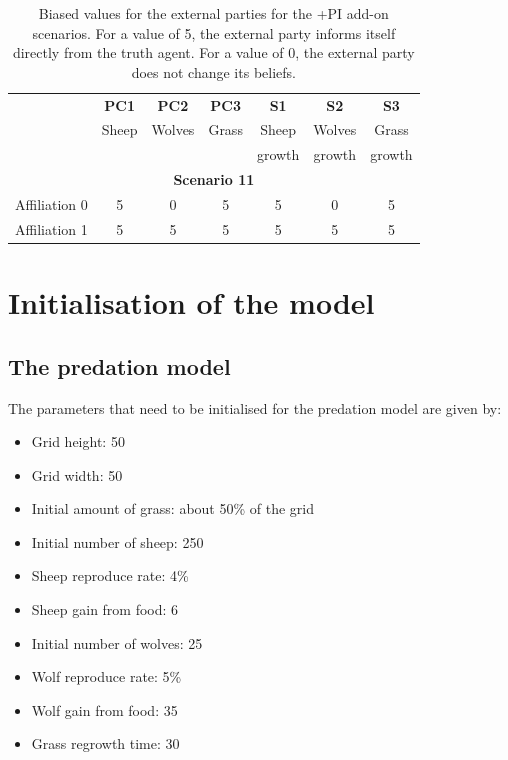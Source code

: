 \documentclass[12pt]{article}
\begin{document}
\begin{table}[h!]
\begin{center}
\begin{tabular}{ |c|c|c|c|c|c|c| } 
\hline

			& {\bfseries PC1}
					&  {\bfseries PC2}
							&  {\bfseries PC3}
									&  {\bfseries S1}	
											&  {\bfseries S2}	
													&  {\bfseries S3}  	\\ 
			& Sheep	& Wolves	& Grass	& Sheep	& Wolves	& Grass 	\\
			&		&		&		& growth	& growth	& growth	\\ \hline \hline \hline
\multicolumn{7}{|c|}{ {\bfseries Scenario 11}}				\\ \hline \hline	
Affiliation 0	& 5		& 0		& 5		& 5		& 0		& 5		\\ \hline
Affiliation 1	& 5		& 5		& 5		& 5		& 5		& 5		\\ \hline

\end{tabular}
\end{center}
\caption{Biased values for the external parties for the +PI add-on scenarios. For a value of 5, the external party informs itself directly from the truth agent. For a value of 0, the external party does not change its beliefs.}
\label{tab:biasPI}
\end{table}


\section{Initialisation of the model}
\label{sec:initialisation}

\subsection{The predation model}

The parameters that need to be initialised for the predation model are given by:

\begin{itemize}
\item Grid height: 50
\item Grid width: 50
\item Initial amount of grass: about 50\% of the grid
\item Initial number of sheep: 250
\item Sheep reproduce rate: 4\%
\item Sheep gain from food: 6
\item Initial number of wolves: 25
\item Wolf reproduce rate: 5\%
\item Wolf gain from food: 35
\item Grass regrowth time: 30
\end{itemize}
\end{document}
